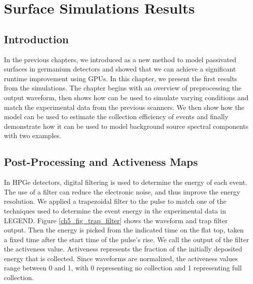 \chapter{Surface Simulations Results}
\label{chap:ehd_res}

\section{Introduction}
In the previous chapters, we introduced {\ehd} as a new method to model passivated surfaces in germanium detectors and showed that we can achieve a significant runtime improvement using GPUs. In this chapter, we present the first results from the simulations. The chapter begins with an overview of preprocessing the output waveform, then shows how {\ehd} can be used to simulate varying conditions and match the experimental data from the previous scanners. We then show how the model can be used to estimate the collection efficiency of {\onbb} events and finally demonstrate how it can be used to model background source spectral components with two examples.

\section{Post-Processing and Activeness Maps}
In HPGe detectors, digital filtering is used to determine the energy of each event. The use of a filter can reduce the electronic noise, and thus improve the energy resolution. We applied a trapezoidal filter to the pulse to match one of the techniques used to determine the event energy in the experimental data in LEGEND. Figure \ref{ch5_fig_trap_filter} shows the waveform and trap filter output. Then the energy is picked from the indicated time on the flat top, taken a fixed time after the start time of the pulse's rise. We call the output of the filter the activeness value. Activeness represents the fraction of the initially deposited energy that is collected. Since {\ehd} waveforms are normalized, the activeness values range between 0 and 1, with 0 representing no collection and 1 representing full collection. 

